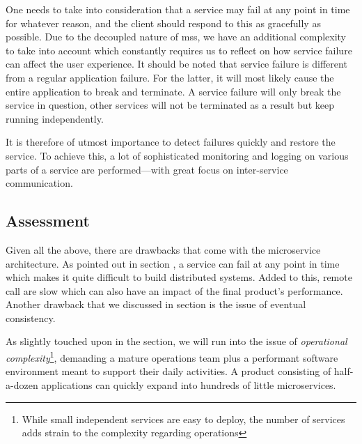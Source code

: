 One needs to take into consideration that a service may fail at any
point in time for whatever reason, and the client should respond to
this as gracefully as possible. Due to the decoupled nature of
\glspl{ms}, we have an additional complexity to take into account
which constantly requires us to reflect on how service failure can
affect the user experience. \cite{ms-definition} It should be noted
that service failure is different from a regular application failure.
For the latter, it will most likely cause the entire application to
break and terminate. A service failure will only break the service in
question, other services will not be terminated as a result but keep
running independently.

It is therefore of utmost importance to detect failures quickly and
restore the service. To achieve this, a lot of sophisticated
monitoring and logging on various parts of a service are
performed---with great focus on inter-service communication.
\cite{ms-definition}


\subsection{Assessment}%

Given all the above, there are drawbacks that come with the
microservice architecture. As pointed out in
section , a service can fail at any point
in time which makes it quite difficult to build distributed systems.
Added to this, remote call are slow which can also have an impact of
the final product's performance. Another drawback that we discussed
in section  is the issue of eventual
consistency.

As slightly touched upon in the
 section, we will run into the
issue of \textit{operational complexity}\footnote{While small
	independent services are easy to deploy, the number of services adds
strain to the complexity regarding operations}, demanding a mature
operations team plus a performant software environment meant to
support their daily activities.
A product consisting of half-a-dozen applications can
quickly expand into hundreds of little microservices.
\cite{ms-trade-off}


